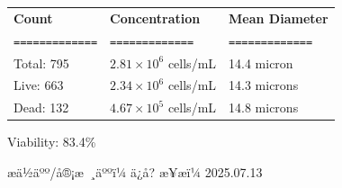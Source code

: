 \documentclass[UTF8,10pt,a4paper,fontset=fandol]{ctexart}
\newcommand{\fieldvalue}[1]{#1}
\newcommand{\handwritten}[1]{#1}
\begin{document}
\begin{tabularx}{\textwidth}{@{}>{\raggedright\arraybackslash}X
>{\raggedright\arraybackslash}X
>{\raggedright\arraybackslash}X@{}}
\textbf{Count} & \textbf{Concentration} & \textbf{Mean Diameter} \\
\texttt{=============} & \texttt{=============} & \texttt{=============} \\

Total:
\fieldvalue{795}
&
\fieldvalue{$2.81{\times}10^{6}$ cells/mL}
&
\fieldvalue{14.4 micron}
\\

Live:
\fieldvalue{663}
&
\fieldvalue{$2.34{\times}10^{6}$ cells/mL}
&
\fieldvalue{14.3 microns}
\\

Dead:
\fieldvalue{132}
&
\fieldvalue{$4.67{\times}10^{5}$ cells/mL}
&
\fieldvalue{14.8 microns}
\\
\end{tabularx}

\medskip
\noindent Viability:
\fieldvalue{83.4\%}

\medskip
\begin{center}
\hfill
{}

\vspace{0.02\textheight}

\hfill
{}
\end{center}

\vfill

\noindent æä½äºº/å®¡æ ¸äººï¼
\fieldvalue{\handwritten{ä¿å?}}
\hfill
æ¥æï¼
\fieldvalue{\handwritten{2025.07.13}}
\end{document}
